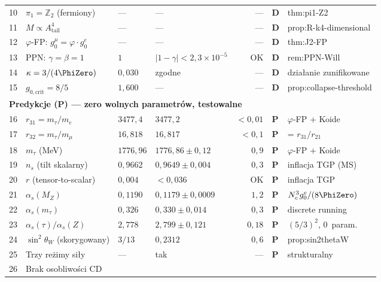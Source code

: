 \begin{center}
\begin{longtable}{@{}rp{3.8cm}llrll@{}}
10 & $\pi_1 = \mathbb{Z}_2$ (fermiony)
   & --- & --- & --- & \textbf{D} & thm:pi1-Z2 \\
11 & $M \propto A_{\mathrm{tail}}^4$
   & --- & --- & --- & \textbf{D} & prop:R-k4-dimensional \\
12 & $\varphi$-FP: $g_0^\mu = \varphi \cdot g_0^e$
   & --- & --- & --- & \textbf{D} & thm:J2-FP \\
13 & PPN: $\gamma = \beta = 1$
   & $1$ & $|1-\gamma| < 2{,}3 \times 10^{-5}$ & OK & \textbf{D} & rem:PPN-Will \\
14 & $\kappa = 3/(4\PhiZero)$
   & $0{,}030$ & zgodne & --- & \textbf{D} & dzia\l{}anie zunifikowane \\
15 & $g_{0,\mathrm{crit}} = 8/5$
   & $1{,}600$ & --- & --- & \textbf{D} & prop:collapse-threshold \\
%
\midrule
%
%
\multicolumn{7}{l}{\textbf{Predykcje (P) --- zero wolnych parametr\'ow, testowalne}} \\
\midrule
%
16 & $r_{31} = m_\tau / m_e$
   & $3477{,}4$ & $3477{,}2$ & $< 0{,}01$ & \textbf{P} & $\varphi$-FP + Koide \\
17 & $r_{32} = m_\tau / m_\mu$
   & $16{,}818$ & $16{,}817$ & $< 0{,}1$ & \textbf{P} & = $r_{31}/r_{21}$ \\
18 & $m_\tau$ (MeV)
   & $1776{,}96$ & $1776{,}86 \pm 0{,}12$ & $0{,}9$ & \textbf{P} & $\varphi$-FP + Koide \\
%
19 & $n_s$ (tilt skalarny)
   & $0{,}9662$ & $0{,}9649 \pm 0{,}004$ & $0{,}3$ & \textbf{P} & inflacja TGP (MS) \\
20 & $r$ (tensor-to-scalar)
   & $0{,}004$ & $< 0{,}036$ & OK & \textbf{P} & inflacja TGP \\
%
21 & $\alpha_s(M_Z)$
   & $0{,}1190$ & $0{,}1179 \pm 0{,}0009$ & $1{,}2$ & \textbf{P} & $N_c^3 g_0^e/(8\PhiZero)$ \\
22 & $\alpha_s(m_\tau)$
   & $0{,}326$ & $0{,}330 \pm 0{,}014$ & $0{,}3$ & \textbf{P} & discrete running \\
23 & $\alpha_s(\tau)/\alpha_s(Z)$
   & $2{,}778$ & $2{,}799 \pm 0{,}121$ & $0{,}18$ & \textbf{P} & $(5/3)^2$, 0~param. \\
24 & $\sin^2\theta_W$ (skorygowany)
   & $3/13$ & $0{,}2312$ & $0{,}6$ & \textbf{P} & prop:sin2thetaW \\
%
25 & Trzy re\.zimy si\l{}y
   & --- & tak & --- & \textbf{P} & strukturalny \\
26 & Brak osobliwo\'sci CD

\end{longtable}
\end{center}
